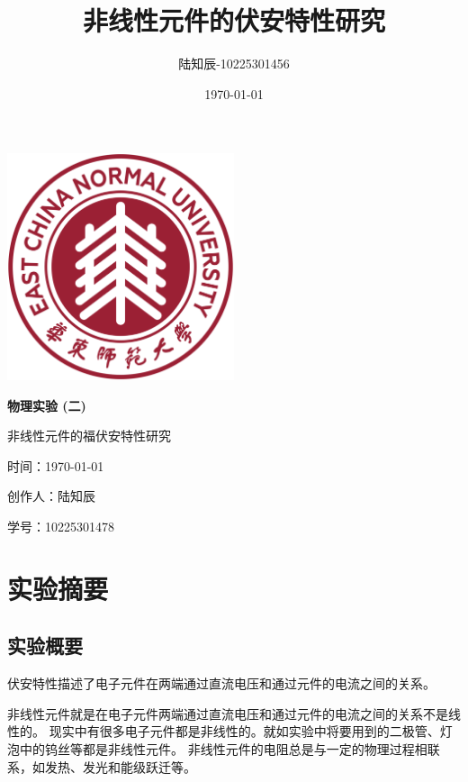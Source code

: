 \documentclass{ctexart}
\title{非线性元件的伏安特性研究}
\author{陆知辰-10225301456}
\date{\today}
\begin{document}
\begin{titlepage}
  \centering
  \includegraphics[width=0.5\textwidth]{ecnu.png}
  
  \vspace*{\baselineskip}
  
  \Huge\textbf{物\quad 理\quad 实\quad 验 \quad (二)}
  \vspace*{0.3\baselineskip}
  
  \huge 非线性元件的福伏安特性研究
  
  \vspace*{2\baselineskip}
  
  \large 时间：\today
  
  \vspace*{\baselineskip}
  
  \large 创作人：陆知辰
  
  \vspace*{\baselineskip}
  
  \large 学号：10225301478
  
\end{titlepage}
\newpage
\tableofcontents
\newpage
\section{实验摘要}
  \subsection{实验概要}
  伏安特性描述了电子元件在两端通过直流电压和通过元件的电流之间的关系。

  非线性元件就是在电子元件两端通过直流电压和通过元件的电流之间的关系不是线性的。
  现实中有很多电子元件都是非线性的。就如实验中将要用到的二极管、灯泡中的钨丝等都是非线性元件。
  非线性元件的电阻总是与一定的物理过程相联系，如发热、发光和能级跃迁等。
\end{document}
